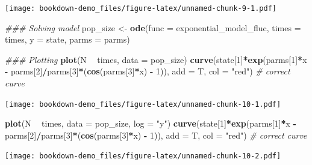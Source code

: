 \documentclass[
]{book}
\newenvironment{Shaded}{\begin{snugshade}}{\end{snugshade}}
\newcommand{\CommentTok}[1]{\textcolor[rgb]{0.56,0.35,0.01}{\textit{#1}}}
\newcommand{\DataTypeTok}[1]{\textcolor[rgb]{0.13,0.29,0.53}{#1}}
\newcommand{\DecValTok}[1]{\textcolor[rgb]{0.00,0.00,0.81}{#1}}
\newcommand{\KeywordTok}[1]{\textcolor[rgb]{0.13,0.29,0.53}{\textbf{#1}}}
\newcommand{\NormalTok}[1]{#1}
\newcommand{\OperatorTok}[1]{\textcolor[rgb]{0.81,0.36,0.00}{\textbf{#1}}}
\newcommand{\StringTok}[1]{\textcolor[rgb]{0.31,0.60,0.02}{#1}}
\begin{document}
\texttt{[image: bookdown-demo\_files/figure-latex/unnamed-chunk-9-1.pdf]}

\begin{Shaded}
\begin{Highlighting}[]
\CommentTok{### Solving model}
\NormalTok{pop_size <-}\StringTok{ }\KeywordTok{ode}\NormalTok{(}\DataTypeTok{func =}\NormalTok{ exponential_model_fluc, }\DataTypeTok{times =}\NormalTok{ times, }\DataTypeTok{y =}\NormalTok{ state, }\DataTypeTok{parms =}\NormalTok{ parms)}

\CommentTok{### Plotting}
\KeywordTok{plot}\NormalTok{(N }\OperatorTok{~}\StringTok{ }\NormalTok{times, }\DataTypeTok{data =}\NormalTok{ pop_size)}
\KeywordTok{curve}\NormalTok{(state[}\DecValTok{1}\NormalTok{]}\OperatorTok{*}\KeywordTok{exp}\NormalTok{(parms[}\DecValTok{1}\NormalTok{]}\OperatorTok{*}\NormalTok{x }\OperatorTok{-}\StringTok{ }\NormalTok{parms[}\DecValTok{2}\NormalTok{]}\OperatorTok{/}\NormalTok{parms[}\DecValTok{3}\NormalTok{]}\OperatorTok{*}\NormalTok{(}\KeywordTok{cos}\NormalTok{(parms[}\DecValTok{3}\NormalTok{]}\OperatorTok{*}\NormalTok{x) }\OperatorTok{-}\StringTok{ }\DecValTok{1}\NormalTok{)), }\DataTypeTok{add =}\NormalTok{ T, }\DataTypeTok{col =} \StringTok{"red"}\NormalTok{) }\CommentTok{# correct curve}
\end{Highlighting}
\end{Shaded}

\texttt{[image: bookdown-demo\_files/figure-latex/unnamed-chunk-10-1.pdf]}

\begin{Shaded}
\begin{Highlighting}[]
\KeywordTok{plot}\NormalTok{(N }\OperatorTok{~}\StringTok{ }\NormalTok{times, }\DataTypeTok{data =}\NormalTok{ pop_size, }\DataTypeTok{log =} \StringTok{"y"}\NormalTok{)}
\KeywordTok{curve}\NormalTok{(state[}\DecValTok{1}\NormalTok{]}\OperatorTok{*}\KeywordTok{exp}\NormalTok{(parms[}\DecValTok{1}\NormalTok{]}\OperatorTok{*}\NormalTok{x }\OperatorTok{-}\StringTok{ }\NormalTok{parms[}\DecValTok{2}\NormalTok{]}\OperatorTok{/}\NormalTok{parms[}\DecValTok{3}\NormalTok{]}\OperatorTok{*}\NormalTok{(}\KeywordTok{cos}\NormalTok{(parms[}\DecValTok{3}\NormalTok{]}\OperatorTok{*}\NormalTok{x) }\OperatorTok{-}\StringTok{ }\DecValTok{1}\NormalTok{)), }\DataTypeTok{add =}\NormalTok{ T, }\DataTypeTok{col =} \StringTok{"red"}\NormalTok{) }\CommentTok{# correct curve}
\end{Highlighting}
\end{Shaded}

\texttt{[image: bookdown-demo\_files/figure-latex/unnamed-chunk-10-2.pdf]}
\end{document}
